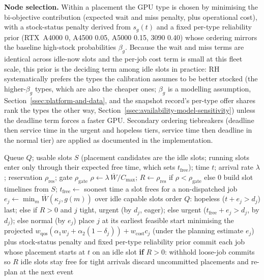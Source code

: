 \textbf{Node selection.} Within a placement the GPU type is chosen by minimising the bi-objective contribution (expected wait and miss penalty, plus operational cost), with a stock-status penalty derived from $s_g(t)$ and a fixed per-type reliability prior (RTX~A4000 0, A4500 0.05, A5000 0.15, 3090 0.40) whose ordering mirrors the baseline high-stock probabilities $\beta_g$. Because the wait and miss terms are identical across idle-now slots and the per-job cost term is small at this fleet scale, this prior is the deciding term among idle slots in practice: RH systematically prefers the types the calibration assumes to be better stocked (the higher-$\beta_g$ types, which are also the cheaper ones; $\beta_g$ is a modelling assumption, Section~\ref{ssec:platform-and-data}, and the snapshot record's per-type offer shares rank the types the other way, Section~\ref{ssec:availability-model-sensitivity}) unless the deadline term forces a faster GPU. Secondary ordering tiebreakers (deadline then service time in the urgent and hopeless tiers, service time then deadline in the normal tier) are applied as documented in the implementation.

\begin{algorithm}[H]
\caption{Rolling-Horizon Scheduler}
\label{alg:rh}
\begin{algorithmic}[1]
\REQUIRE Queue $Q$; usable slots $S$ (placement candidates are the idle slots; running slots enter only through their expected free time, which sets $t_{\text{free}}$); time $t$; arrival rate $\lambda$; reservation $\rho_{\text{res}}$; gate $\rho_{\text{gate}}$
\STATE $\rho \leftarrow \lambda\,\overline{W}/C_{\max}$; \quad $R \leftarrow \rho_{\text{res}}$ if $\rho < \rho_{\text{gate}}$ else $0$ 
\STATE build slot timelines from $S$; $t_{\text{free}} \leftarrow$ soonest time a slot frees for a non-dispatched job
  \STATE $e_j \leftarrow \min_{m} \overline{W}(\kappa_j, g(m))$ over idle capable slots
\ENDFOR
\STATE order $Q$: hopeless ($t+e_j > d_j$) last; else if $R>0$ and $j$ tight, urgent (by $d_j$, eager); else urgent ($t_{\text{free}}+e_j > d_j$, by $d_j$); else normal (by $e_j$)
  \STATE place $j$ at its earliest feasible start minimising the projected $w_{\text{qos}}(\alpha_1 w_j + \alpha_2 (1-\delta_j)) + w_{\text{cost}} c_j$ (under the planning estimate $e_j$) plus stock-status penalty and fixed per-type reliability prior
\ENDFOR
\STATE commit each job whose placement starts at $t$ on an idle slot
\STATE \textbf{if} $R>0$: withhold loose-job commits so $R$ idle slots stay free for tight arrivals
\STATE discard uncommitted placements and re-plan at the next event
\end{algorithmic}
\end{algorithm}

